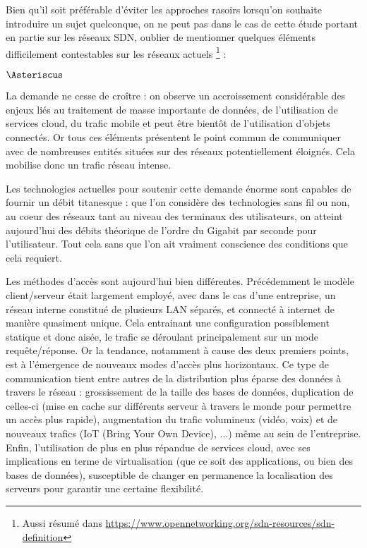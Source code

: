 Bien qu'il soit préférable d'éviter les approches rasoirs lorsqu'on souhaite introduire un sujet quelconque, on ne peut pas dans le cas de cette étude portant en partie sur les réseaux SDN, oublier de mentionner quelques éléments difficilement contestables sur les réseaux actuels \footnote{\label{of_def}Aussi résumé dans \url{https://www.opennetworking.org/sdn-resources/sdn-definition}} :\\

\begin{list}{$\Asteriscus$}{}

\item La demande ne cesse de croître : on observe un accroissement considérable des enjeux liés au traitement de masse importante de données, de l'utilisation de services cloud, du trafic mobile et peut être bientôt de l'utilisation d'objets connectés. Or tous ces éléments présentent le point commun de communiquer avec de nombreuses entités situées sur des réseaux potentiellement éloignés. Cela mobilise donc un trafic réseau intense.

\item Les technologies actuelles pour soutenir cette demande énorme sont capables de fournir un débit titanesque : que l'on considère des technologies sans fil ou non, au coeur des réseaux tant au niveau des terminaux des utilisateurs, on atteint aujourd'hui des débits théorique de l'ordre du Gigabit par seconde pour l'utilisateur. Tout cela sans que l'on ait vraiment conscience des conditions que cela requiert.

\item Les méthodes d'accès sont aujourd'hui bien différentes. Précédemment le modèle client/serveur était largement employé, avec dans le cas d'une entreprise, un réseau interne constitué de plusieurs LAN séparés, et connecté à internet de manière quasiment unique. Cela entrainant une configuration possiblement statique et donc aisée, le trafic se déroulant principalement sur un mode requête/réponse. Or la tendance, notamment à cause des deux premiers points, est à l'émergence de nouveaux modes d'accès plus horizontaux. Ce type de communication tient entre autres de la distribution plus éparse des données à travers le réseau : grossissement de la taille des bases de données, duplication de celles-ci (mise en cache sur différents serveur à travers le monde pour permettre un accès plus rapide), augmentation du trafic volumineux (vidéo, voix) et de nouveaux trafics (IoT (Bring Your Own Device), ...) même au sein de l'entreprise. Enfin, l'utilisation de plus en plus répandue de services cloud, avec ses implications en terme de virtualisation (que ce soit des applications, ou bien des bases de données), susceptible de changer en permanence la localisation des serveurs pour garantir une certaine flexibilité.\\

\end{list}

